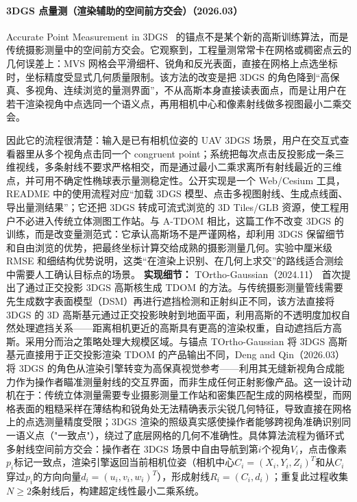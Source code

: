\paragraph{3DGS 点量测（渲染辅助的空间前方交会）（2026.03）}
Accurate Point Measurement in 3DGS~\cite{2603_24716} 的锚点不是某个新的高斯训练算法，而是传统摄影测量中的空间前方交会。它观察到，工程量测常常卡在网格或稠密点云的几何误差上：MVS 网格会平滑细杆、锐角和反光表面，直接在网格上点选坐标时，坐标精度受显式几何质量限制。该方法的改变是把 3DGS 的角色降到“高保真、多视角、连续浏览的量测界面”，不从高斯本身直接读表面点，而是让用户在若干渲染视角中点选同一个语义点，再用相机中心和像素射线做多视图最小二乘交会。

因此它的流程很清楚：输入是已有相机位姿的 UAV 3DGS 场景，用户在交互式查看器里从多个视角点击同一个 congruent point；系统把每次点击反投影成一条三维视线，多条射线不要求严格相交，而是通过最小二乘求离所有射线最近的三维点，并可用不确定性椭球表示量测稳定性。公开实现是一个 Web/Cesium 工具，README 中的使用流程对应“加载 3DGS 模型、点击多视图射线、生成点线面、导出量测结果”；它还把 3DGS 转成可流式浏览的 3D Tiles/GLB 资源，使工程用户不必进入传统立体测图工作站。与 A-TDOM 相比，这篇工作不改变 3DGS 的训练，而是改变量测范式：它承认高斯场不是严谨网格，却利用 3DGS 保留细节和自由浏览的优势，把最终坐标计算交给成熟的摄影测量几何。实验中厘米级 RMSE 和细结构优势说明，这类“在渲染上识别、在几何上求交”的路线适合测绘中需要人工确认目标点的场景。
\textbf{实现细节：} TOrtho-Gaussian（2024.11） 首次提出了通过正交投影 3DGS 高斯核生成 TDOM 的方法。与传统摄影测量管线需要先生成数字表面模型（DSM）再进行遮挡检测和正射纠正不同，该方法直接将 3DGS 的 3D 高斯基元通过正交投影映射到地面平面，利用高斯的不透明度加权自然处理遮挡关系——距离相机更近的高斯具有更高的渲染权重，自动遮挡后方高斯。采用分而治之策略处理大规模区域。与锚点 TOrtho-Gaussian 将 3DGS 高斯基元直接用于正交投影渲染 TDOM 的产品输出不同，Deng and Qin（2026.03） 将 3DGS 的角色从渲染引擎转变为高保真视觉参考——利用其无缝新视角合成能力作为操作者瞄准测量射线的交互界面，而非生成任何正射影像产品。这一设计动机在于：传统立体测量需要专业摄影测量工作站和密集匹配生成的网格模型，而网格表面的粗糙采样在薄结构和锐角处无法精确表示尖锐几何特征，导致直接在网格上的点选测量精度受限；3DGS 渲染的照级真实感使操作者能够跨视角准确识别同一语义点（"一致点"），绕过了底层网格的几何不准确性。具体算法流程为循环式多射线空间前方交会：操作者在 3DGS 场景中自由导航到第$i$个视角$V_i$，点击像素$p_i$标记一致点，渲染引擎返回当前相机位姿（相机中心$C_i = (X_i, Y_i, Z_i)^T$和从$C_i$穿过$p_i$的方向向量$d_i = (u_i, v_i, w_i)^T$），形成射线$R_i = (C_i, d_i)$；重复此过程收集$N \geq 2$条射线后，构建超定线性最小二乘系统。
